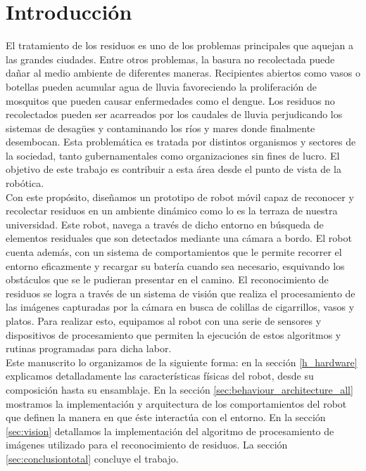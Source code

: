 
\section{\label{intro} Introducci\'on}
El tratamiento de los residuos es uno de los problemas principales que 
aquejan a las grandes ciudades. Entre otros problemas, la basura no 
recolectada puede da\~nar al medio ambiente de diferentes maneras. Recipientes
abiertos como vasos o botellas pueden acumular agua de lluvia favoreciendo la 
proliferaci\'on de mosquitos que pueden causar enfermedades como el dengue. Los
residuos no recolectados pueden ser acarreados por los caudales de lluvia
perjudicando los sistemas de desag\"ues y contaminando los r\'ios y mares donde
finalmente desembocan. Esta problem\'atica es tratada por distintos organismos
y sectores de la sociedad, tanto gubernamentales como organizaciones sin fines
de lucro. El objetivo de este trabajo es contribuir a esta \'area desde el
punto de vista de la rob\'otica.
\\\indent
Con este prop\'osito, dise\~namos un prototipo de robot m\'ovil capaz de
reconocer y recolectar residuos en un ambiente din\'amico como lo es la terraza
de nuestra universidad. Este robot, navega a trav\'es de dicho entorno
en b\'usqueda de elementos residuales que
son detectados mediante una c\'amara a bordo. El robot cuenta adem\'as,
con un sistema de comportamientos que le permite recorrer el entorno
eficazmente y recargar su bater\'ia cuando sea necesario, esquivando
los obst\'aculos que se le pudieran presentar en el camino. El reconocimiento
de residuos se logra a trav\'es de un sistema de visi\'on que realiza el
procesamiento de las im\'agenes capturadas por la c\'amara en busca de colillas
de cigarrillos, vasos y platos. Para realizar esto, equipamos al robot con
una serie de sensores y dispositivos de procesamiento que permiten la
ejecuci\'on de estos algoritmos y rutinas programadas para dicha labor.
\\\indent
Este manuscrito lo organizamos de la siguiente forma: en la secci\'on
\ref{h_hardware} explicamos detalladamente las caracter\'isticas f\'isicas del
robot, desde su composici\'on hasta su ensamblaje. En la secci\'on
\ref{sec:behaviour_architecture_all} mostramos la implementaci\'on y
arquitectura de los comportamientos del robot que definen la manera en que
\'este interact\'ua con el entorno. En la secci\'on \ref{sec:vision}
detallamos la implementaci\'on del algoritmo de procesamiento de im\'agenes
utilizado para el reconocimiento de residuos. La secci\'on
\ref{sec:conclusiontotal} concluye el trabajo.

